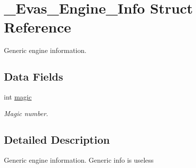 \section{\_\-Evas\_\-Engine\_\-Info Struct Reference}
\label{struct__Evas__Engine__Info}


Generic engine information.  


\subsection*{Data Fields}
\begin{DoxyCompactItemize}
\item 
int \hyperlink{struct__Evas__Engine__Info_ad990a452b19dbd3b0ea73e3c1827dcb1}{magic}\label{struct__Evas__Engine__Info_ad990a452b19dbd3b0ea73e3c1827dcb1}

\begin{DoxyCompactList}\small\item\em Magic number. \item\end{DoxyCompactList}\end{DoxyCompactItemize}


\subsection{Detailed Description}
Generic engine information. Generic info is useless 
